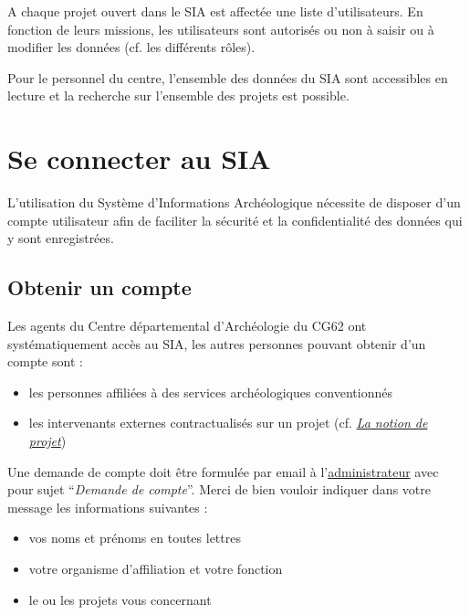 \documentclass[letterpaper,10pt,french]{sphinxmanual}
\begin{document}
A chaque projet ouvert dans le SIA est affectée une liste d’utilisateurs. En fonction de leurs missions, les utilisateurs sont autorisés ou non à saisir ou à modifier les données (cf. les différents rôles).

Pour le personnel du centre, l’ensemble des données du SIA sont accessibles en lecture et la recherche sur l’ensemble des projets est possible.


\chapter{Se connecter au SIA}
\label{manuel/connexion::doc}\label{manuel/connexion:se-connecter-au-sia}
L'utilisation du Système d'Informations Archéologique nécessite de disposer d'un compte utilisateur afin de faciliter la sécurité et la confidentialité des données qui y sont enregistrées.


\section{Obtenir un compte}
\label{manuel/connexion:obtenir-un-compte}
Les agents du Centre départemental d'Archéologie du  CG62 ont systématiquement accès au SIA, les autres personnes pouvant obtenir d'un compte sont :
\begin{itemize}
\item {} 
les personnes affiliées à des services archéologiques conventionnés

\item {} 
les intervenants externes contractualisés sur un projet (cf. {\hyperref[manuel/intro:def-projet]{\emph{La notion de projet}}})

\end{itemize}

Une demande de compte doit être formulée par email à l'\href{mailto:admin.sia@cg62.fr}{administrateur} avec pour sujet ``\emph{Demande de compte}''. Merci de bien vouloir indiquer dans votre message les informations suivantes :
\begin{itemize}
\item {} 
vos noms et prénoms en toutes lettres

\item {} 
votre organisme d'affiliation et votre fonction

\item {} 
le ou les projets vous concernant

\end{itemize}
\end{document}
